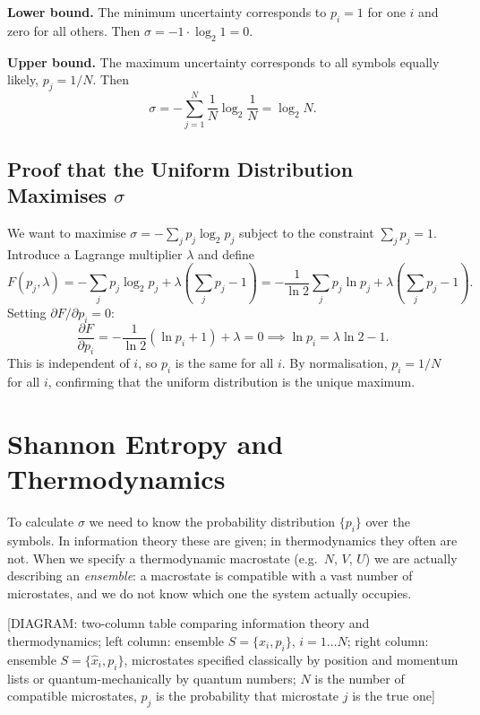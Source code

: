 \textbf{Lower bound.} The minimum uncertainty corresponds to $p_i = 1$ for one $i$ and zero for all others. Then $\sigma = -1\cdot\log_2 1 = 0$.

\textbf{Upper bound.} The maximum uncertainty corresponds to all symbols equally likely, $p_j = 1/N$. Then
\begin{equation}
    \sigma = -\sum_{j=1}^{N} \frac{1}{N}\log_2\frac{1}{N} = \log_2 N.
\end{equation}

\subsection{Proof that the Uniform Distribution Maximises $\sigma$}

We want to maximise $\sigma = -\sum_j p_j \log_2 p_j$ subject to the constraint $\sum_j p_j = 1$. Introduce a Lagrange multiplier $\lambda$ and define
\begin{equation}
    F(p_j, \lambda) = -\sum_j p_j \log_2 p_j + \lambda\!\left(\sum_j p_j - 1\right)
    = -\frac{1}{\ln 2}\sum_j p_j \ln p_j + \lambda\!\left(\sum_j p_j - 1\right).
\end{equation}
Setting $\partial F/\partial p_i = 0$:
\begin{equation}
    \frac{\partial F}{\partial p_i} = -\frac{1}{\ln 2}(\ln p_i + 1) + \lambda = 0 \implies \ln p_i = \lambda \ln 2 - 1.
\end{equation}
This is independent of $i$, so $p_i$ is the same for all $i$. By normalisation, $p_i = 1/N$ for all $i$, confirming that the uniform distribution is the unique maximum.

\section{Shannon Entropy and Thermodynamics}

To calculate $\sigma$ we need to know the probability distribution $\{p_i\}$ over the symbols. In information theory these are given; in thermodynamics they often are not. When we specify a thermodynamic macrostate (e.g.\ $N$, $V$, $U$) we are actually describing an \emph{ensemble}: a macrostate is compatible with a vast number of microstates, and we do not know which one the system actually occupies.

\begin{center}[DIAGRAM: two-column table comparing information theory and thermodynamics; left column: ensemble $S = \{x_i, p_i\}$, $i = 1\ldots N$; right column: ensemble $S = \{\hat{x}_i, p_i\}$, microstates specified classically by position and momentum lists or quantum-mechanically by quantum numbers; $N$ is the number of compatible microstates, $p_j$ is the probability that microstate $j$ is the true one]\end{center}

